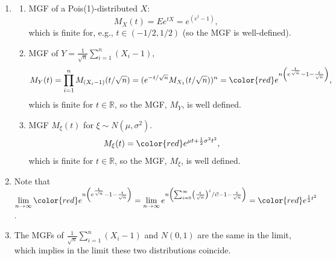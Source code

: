 \begin{Solution}{1.26}
		\begin{enumerate}
			\item
			\begin{enumerate}
			\item {MGF of a Pois(1)-distributed $X$}: $$M_X(t)=Ee^{tX} =e^{(e^t-1)},$$ {which is finite for, e.g., $t\in (-1/2, 1/2)$ (so the MGF is well-defined)}.\\
			\item MGF of $Y=\frac{1}{\sqrt{n}}\sum_{i=1}^n (X_i-1),$
			\begin{align*}
				M_{Y}(t)= \prod_{i=1}^{n}M_{(X_i-1)}(t/\sqrt{n}) =(e^{-t/\sqrt{n}} M_{X_1}(t/\sqrt{n}))^n = {\color{red}e^{n\left(e^{\frac{t}{\sqrt{n}}}-1-\frac{t}{\sqrt{n}}\right)}},
			\end{align*} {which is finite for $t\in \mathbb{R}$, so the MGF,  $M_Y$, is well defined.}
			\item {MGF $M_\xi(t)$ for $\xi \sim N(\mu,\sigma^2)$.}
			\begin{align*}
				{ M_\xi(t)}& =  {\color{red}e^{\mu t + \frac{1}{2}\sigma^2 t^2}},
			\end{align*}  {which is finite for $t\in \mathbb{R}$, so the MGF,  $M_\xi$, is well defined.}
		\end{enumerate}
		\item Note that $\lim\limits_{n\rightarrow \infty }{\color{red}e^{n\left(e^{\frac{t}{\sqrt{n}}}-1-\frac{t}{\sqrt{n}}\right)}}= \lim\limits_{n\rightarrow \infty}{e^{n\left(\sum_{i=0}^{\infty}\left(\frac{t}{\sqrt{n}} \right)^i/i!   -1-\frac{t}{\sqrt{n}}\right)}}=  {\color{red}e^{\frac{1}{2}t^2}}$.
		\item{The MGFs of $\frac{1}{\sqrt{n}}\sum_{i=1}^n (X_i-1)$ and $N(0,1)$ are the same in the limit}, which implies in the limit these two distributions coincide.
	\end{enumerate}~\\
	
\end{Solution}
